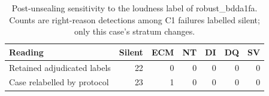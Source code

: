 \begin{table}[!ht]
\centering\footnotesize
\caption{Post-unsealing sensitivity to the loudness label of robust\_bdda1fa. Counts are right-reason detections among C1 failures labelled silent; only this case's stratum changes.}\label{tab:v2_loudness_sensitivity}
\begin{tabular*}{\linewidth}{@{\extracolsep{\fill}}lrrrrrr@{}}
\toprule
Reading & Silent & ECM & NT & DI & DQ & SV \\
\midrule
Retained adjudicated labels & 22 & 0 & 0 & 0 & 0 & 0 \\
Case relabelled by protocol & 23 & 1 & 0 & 0 & 0 & 0 \\
\bottomrule
\end{tabular*}
\end{table}

